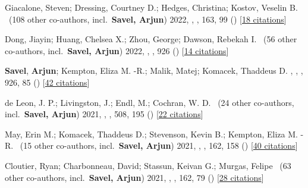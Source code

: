 \item[{\color{numcolor}\scriptsize10}] Giacalone, Steven; Dressing, Courtney D.; Hedges, Christina; Kostov, Veselin B. \etal\ ({108} other co-authors, incl.\ \textbf{Savel, Arjun}) 2022, , \aj, {163}, 99 () [\href{https://ui.adsabs.harvard.edu/abs/2022AJ....163...99G}{18 citations}]

\item[{\color{numcolor}\scriptsize9}] Dong, Jiayin; Huang, Chelsea X.; Zhou, George; Dawson, Rebekah I. \etal\ ({56} other co-authors, incl.\ \textbf{Savel, Arjun}) 2022, , \apj, {926} () [\href{https://ui.adsabs.harvard.edu/abs/2022ApJ...926L...7D}{14 citations}]

\item[{\color{numcolor}\scriptsize8}] \textbf{Savel}, \textbf{Arjun}; Kempton, Eliza M. -R.; Malik, Matej; Komacek, Thaddeus D. , , \apj, {926}, 85 () [\href{https://ui.adsabs.harvard.edu/abs/2022ApJ...926...85S}{42 citations}]

\item[{\color{numcolor}\scriptsize7}] de Leon, J. P.; Livingston, J.; Endl, M.; Cochran, W. D. \etal\ ({24} other co-authors, incl.\ \textbf{Savel, Arjun}) 2021, , \mnras, {508}, 195 () [\href{https://ui.adsabs.harvard.edu/abs/2021MNRAS.508..195D}{22 citations}]

\item[{\color{numcolor}\scriptsize6}] May, Erin M.; Komacek, Thaddeus D.; Stevenson, Kevin B.; Kempton, Eliza M. -R. \etal\ ({15} other co-authors, incl.\ \textbf{Savel, Arjun}) 2021, , \aj, {162}, 158 () [\href{https://ui.adsabs.harvard.edu/abs/2021AJ....162..158M}{40 citations}]

\item[{\color{numcolor}\scriptsize5}] Cloutier, Ryan; Charbonneau, David; Stassun, Keivan G.; Murgas, Felipe \etal\ ({63} other co-authors, incl.\ \textbf{Savel, Arjun}) 2021, , \aj, {162}, 79 () [\href{https://ui.adsabs.harvard.edu/abs/2021AJ....162...79C}{28 citations}]


